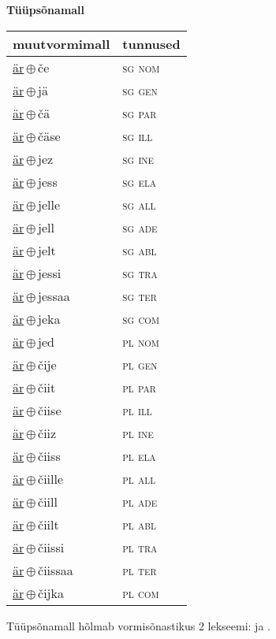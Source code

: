 

\vspace{3.5em}
\noindent \begin{minipage}{\textwidth}
\noindent \textbf{Tüüpsõnamall \,}\\

\begin{sideways}
\begin{tabular}{l l}
muutvormimall & tunnused \\
\hline
\underline{är}\,$\oplus$\,če & \textsc{ sg nom } \\
\underline{är}\,$\oplus$\,jä & \textsc{ sg gen } \\
\underline{är}\,$\oplus$\,čä & \textsc{ sg par } \\
\underline{är}\,$\oplus$\,čäse & \textsc{ sg ill } \\
\underline{är}\,$\oplus$\,jez & \textsc{ sg ine } \\
\underline{är}\,$\oplus$\,jess & \textsc{ sg ela } \\
\underline{är}\,$\oplus$\,jelle & \textsc{ sg all } \\
\underline{är}\,$\oplus$\,jell & \textsc{ sg ade } \\
\underline{är}\,$\oplus$\,jelt & \textsc{ sg abl } \\
\underline{är}\,$\oplus$\,jessi & \textsc{ sg tra } \\
\underline{är}\,$\oplus$\,jessaa & \textsc{ sg ter } \\
\underline{är}\,$\oplus$\,jeka & \textsc{ sg com } \\
\underline{är}\,$\oplus$\,jed & \textsc{ pl nom } \\
\underline{är}\,$\oplus$\,čije & \textsc{ pl gen } \\
\underline{är}\,$\oplus$\,čiit & \textsc{ pl par } \\
\underline{är}\,$\oplus$\,čiise & \textsc{ pl ill } \\
\underline{är}\,$\oplus$\,čiiz & \textsc{ pl ine } \\
\underline{är}\,$\oplus$\,čiiss & \textsc{ pl ela } \\
\underline{är}\,$\oplus$\,čiille & \textsc{ pl all } \\
\underline{är}\,$\oplus$\,čiill & \textsc{ pl ade } \\
\underline{är}\,$\oplus$\,čiilt & \textsc{ pl abl } \\
\underline{är}\,$\oplus$\,čiissi & \textsc{ pl tra } \\
\underline{är}\,$\oplus$\,čiissaa & \textsc{ pl ter } \\
\underline{är}\,$\oplus$\,čijka & \textsc{ pl com } \\
\end{tabular}
\end{sideways}
\label{tab:tüüpsõnamall-ärče}

\end{minipage}

 
\vspace{1em}
\noindent Tüüpsõnamall  hõlmab vormisõnastikus 2 lekseemi:  ja .

